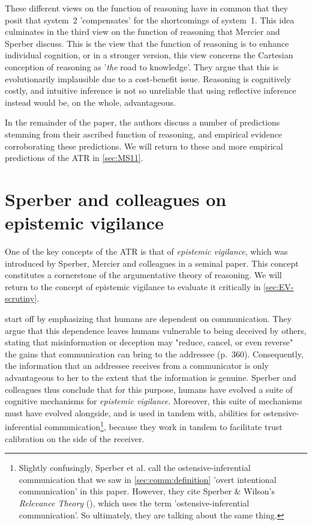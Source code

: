 These different views on the function of reasoning have in common that they posit that system~2 'compensates' for the shortcomings of system~1.
This idea culminates in the third view on the function of reasoning that Mercier and Sperber discuss. This is the view that the function of reasoning is to enhance individual cognition, or in a stronger version, this view concerns the Cartesian conception of reasoning as '\emph{the} road to knowledge'.
They argue that this is evolutionarily implausible due to a cost-benefit issue.
Reasoning is cognitively costly, and intuitive inference is not so unreliable that using reflective inference instead would be, on the whole, advantageous.

In the remainder of the paper, the authors discuss a number of predictions stemming from their ascribed function of reasoning, and empirical evidence corroborating these predictions. We will return to these and more empirical predictions of the ATR in \cref{sec:MS11}.

\section{Sperber and colleagues on epistemic vigilance}
\label{sec:Sperber10}

One of the key concepts of the ATR is that of \emph{epistemic vigilance}, which was introduced by Sperber, Mercier and colleagues in a seminal \citeyear{Sperber10} paper.
This concept constitutes a cornerstone of the argumentative theory of reasoning. We will return to the concept of epistemic vigilance to evaluate it critically in \cref{sec:EV-scrutiny}.

\citet{Sperber10} start off by emphasizing that humans are dependent on communication. They argue that this dependence leaves humans vulnerable to being deceived by others, stating that misinformation or deception may "reduce, cancel, or even reverse" the gains that communication can bring to the addressee (p.~360).
Consequently, the information that an addressee receives from a communicator is only advantageous to her to the extent that the information is genuine.
Sperber and colleagues thus conclude that for this purpose, humans have evolved a suite of cognitive mechanisms for \emph{epistemic vigilance}.
Moreover, this suite of mechanisms must have evolved alongside, and is used in tandem with, abilities for ostensive-inferential communication\footnote{Slightly confusingly, Sperber et al. call the ostensive-inferential communication that we saw in \cref{sec:comm:definition} 'overt intentional communication' in this paper. However, they cite Sperber \& Wilson's \emph{Relevance Theory} (\citeyear{SperberWilson86}), which uses the term 'ostensive-inferential communication'. So ultimately, they are talking about the same thing.}, because they work in tandem to facilitate trust calibration on the side of the receiver.

